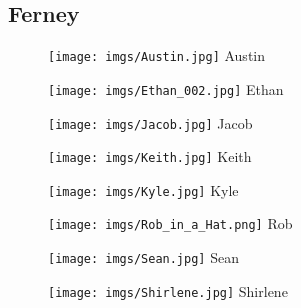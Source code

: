 \documentclass[english]{article}
\begin{document}
\subsection*{Ferney}

\begin{figure}[H]
    \begin{minipage}[b]{0.2\linewidth}
        \centering
        \texttt{[image: imgs/Austin.jpg]}
        Austin
    \end{minipage}
    \hspace{0.5cm}
    \begin{minipage}[b]{0.2\linewidth}
        \centering
        \texttt{[image: imgs/Ethan\_002.jpg]}
        Ethan
    \end{minipage}
    \hspace{0.5cm}
    \begin{minipage}[b]{0.2\linewidth}
        \centering
        \texttt{[image: imgs/Jacob.jpg]}
        Jacob
    \end{minipage}
    \hspace{0.5cm}
    \begin{minipage}[b]{0.2\linewidth}
        \centering
        \texttt{[image: imgs/Keith.jpg]}
        Keith
    \end{minipage}
\end{figure}
\begin{figure}[H]
    \begin{minipage}[b]{0.2\linewidth}
        \centering
        \texttt{[image: imgs/Kyle.jpg]}
        Kyle
    \end{minipage}
    \hspace{0.5cm}
    \begin{minipage}[b]{0.2\linewidth}
        \centering
        \texttt{[image: imgs/Rob\_in\_a\_Hat.png]}
        Rob
    \end{minipage}
    \hspace{0.5cm}
    \begin{minipage}[b]{0.2\linewidth}
        \centering
        \texttt{[image: imgs/Sean.jpg]}
        Sean
    \end{minipage}
    \hspace{0.5cm}
    \begin{minipage}[b]{0.2\linewidth}
        \centering
        \texttt{[image: imgs/Shirlene.jpg]}
        Shirlene
    \end{minipage}
\end{figure}

\clearpage
\end{document}
